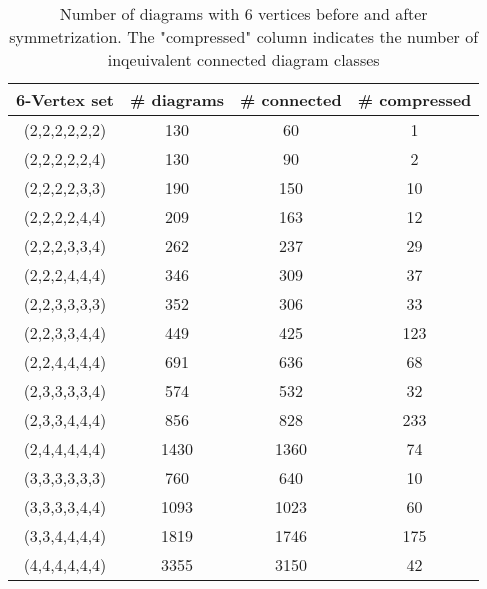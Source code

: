 \documentclass[twocolumn,secnumarabic,amssymb, nobibnotes, aps, prd]{revtex4-2}
\begin{document}
\begin{table}[]
\centering
\begin{tabular}{|c|c|c|c|}
\hline
6-Vertex set & \# diagrams & \# connected & \# compressed \\ \hline
(2,2,2,2,2,2)  & 130 & 60 & 1\\
(2,2,2,2,2,4)  & 130 & 90 & 2 \\
(2,2,2,2,3,3)  & 190 & 150 & 10 \\
(2,2,2,2,4,4)  & 209 & 163 & 12 \\     
(2,2,2,3,3,4)  & 262 & 237 & 29 \\
(2,2,2,4,4,4)  & 346 & 309 & 37 \\
(2,2,3,3,3,3)  & 352 & 306 & 33 \\
(2,2,3,3,4,4)  & 449 & 425 & 123 \\
(2,2,4,4,4,4)  & 691 & 636 & 68\\
(2,3,3,3,3,4)  & 574 & 532 & 32\\
(2,3,3,4,4,4)  & 856 & 828 & 233\\
(2,4,4,4,4,4)  & 1430 & 1360 & 74 \\
(3,3,3,3,3,3)  & 760 &  640 & 10\\
(3,3,3,3,4,4)  & 1093 & 1023 & 60 \\
(3,3,4,4,4,4)  & 1819 & 1746 & 175\\
(4,4,4,4,4,4)  & 3355 & 3150 & 42 \\ 
\hline
\end{tabular}
\caption{Number of diagrams with $6$ vertices before and after symmetrization. The "compressed" column indicates the number of inqeuivalent connected diagram classes}
\label{tab:tab67vert}
\end{table}
\end{document}
